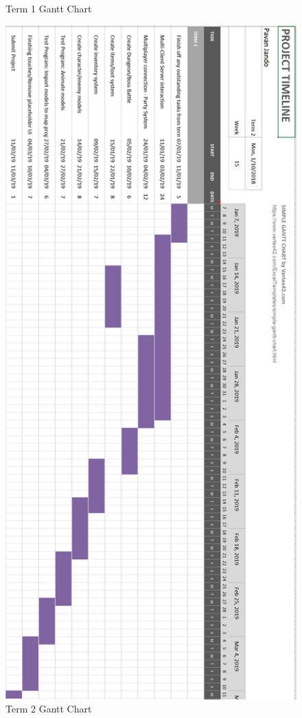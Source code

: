 \documentclass[a4paper]{report}
\begin{document}
\begin{landscape}
\begin{figure}[!h]
	\caption{Term 1 Gantt Chart}
	\label{fig:term1}
\end{figure}
\pagestyle{empty}
\newpage
\pagestyle{empty}
\begin{figure}[!h]
	\centering
	\includegraphics[scale=0.82, angle=90]{term2}
	\caption{Term 2 Gantt Chart}
	\label{fig:term2}
\end{figure}
\end{landscape}
\end{document}
